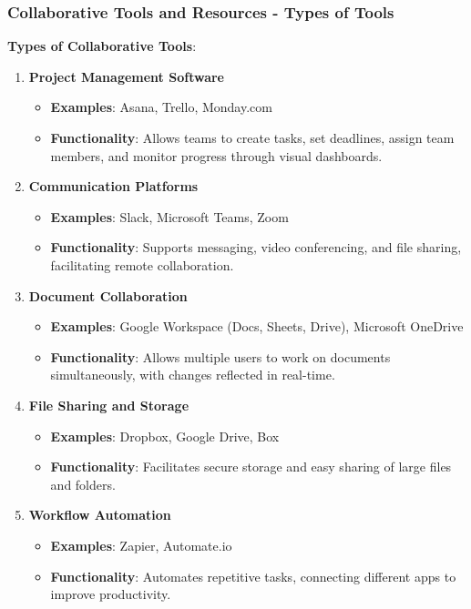 \documentclass[aspectratio=169]{beamer}
\begin{document}
\begin{frame}[fragile]
    \frametitle{Collaborative Tools and Resources - Types of Tools}
    \textbf{Types of Collaborative Tools}:
    \begin{enumerate}
        \item \textbf{Project Management Software}
            \begin{itemize}
                \item \textbf{Examples}: Asana, Trello, Monday.com
                \item \textbf{Functionality}: Allows teams to create tasks, set deadlines, assign team members, and monitor progress through visual dashboards.
            \end{itemize}
        
        \item \textbf{Communication Platforms}
            \begin{itemize}
                \item \textbf{Examples}: Slack, Microsoft Teams, Zoom
                \item \textbf{Functionality}: Supports messaging, video conferencing, and file sharing, facilitating remote collaboration.
            \end{itemize}
        
        \item \textbf{Document Collaboration}
            \begin{itemize}
                \item \textbf{Examples}: Google Workspace (Docs, Sheets, Drive), Microsoft OneDrive
                \item \textbf{Functionality}: Allows multiple users to work on documents simultaneously, with changes reflected in real-time.
            \end{itemize}
        
        \item \textbf{File Sharing and Storage}
            \begin{itemize}
                \item \textbf{Examples}: Dropbox, Google Drive, Box
                \item \textbf{Functionality}: Facilitates secure storage and easy sharing of large files and folders.
            \end{itemize}
        
        \item \textbf{Workflow Automation}
            \begin{itemize}
                \item \textbf{Examples}: Zapier, Automate.io
                \item \textbf{Functionality}: Automates repetitive tasks, connecting different apps to improve productivity.
            \end{itemize}
    \end{enumerate}
\end{frame}
\end{document}
